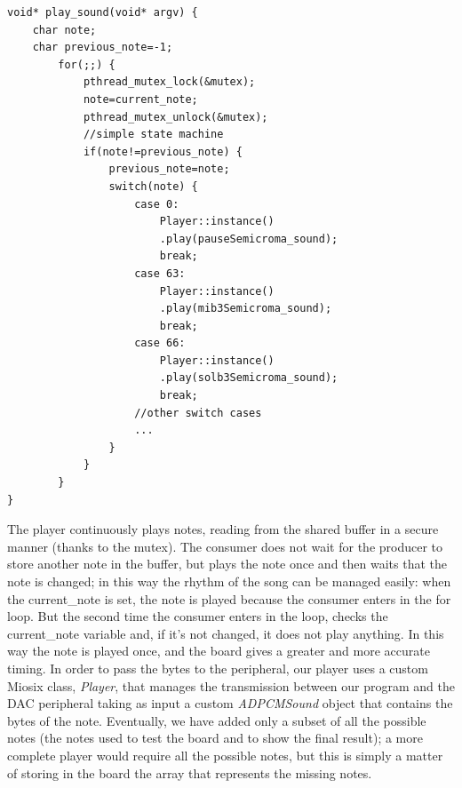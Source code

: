 \documentclass[12pt]{article}
\begin{document}
\begin{lstlisting}
void* play_sound(void* argv) {
	char note;
	char previous_note=-1;
		for(;;) {
			pthread_mutex_lock(&mutex);
			note=current_note;
			pthread_mutex_unlock(&mutex);
			//simple state machine
			if(note!=previous_note) {
				previous_note=note;
				switch(note) {
					case 0:
						Player::instance()
						.play(pauseSemicroma_sound);
						break;
					case 63:
						Player::instance()
						.play(mib3Semicroma_sound);
						break;
					case 66:
						Player::instance()
						.play(solb3Semicroma_sound);
						break;
					//other switch cases
					...
				}
			}
		}
}
\end{lstlisting}
The player continuously plays notes, reading from the shared buffer in a secure manner (thanks to the mutex). The consumer does not wait for the producer to store another note in the buffer, but plays the note once and then waits that the note is changed; in this way the rhythm of the song can be managed easily: when the current\_note is set, the note is played because the consumer enters in the for loop. But the second time the consumer enters in the loop, checks the current\_note variable and, if it's not changed, it does not play anything. In this way the note is played once, and the board gives a greater and more accurate timing.\newline
In order to pass the bytes to the peripheral, our player uses a custom Miosix class, \textit{Player}, that manages the transmission between our program and the DAC peripheral taking as input a custom \textit{ADPCMSound} object that contains the bytes of the note. Eventually, we have added only a subset of all the possible notes (the notes used to test the board and to show the final result); a more complete player would require all the possible notes, but this is simply a matter of storing in the board the array that represents the missing notes.
\end{document}
